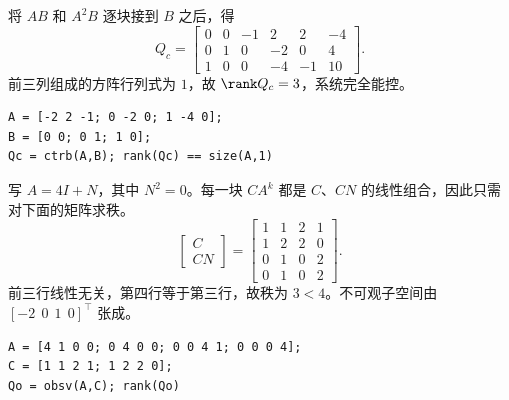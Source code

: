 

\sol 将 $AB$ 和 $A^2B$ 逐块接到 $B$ 之后，得
\[
    Q_c=\begin{bmatrix}
    0&0&-1&2&2&-4\\ 0&1&0&-2&0&4\\ 1&0&0&-4&-1&10
    \end{bmatrix}.
\]
前三列组成的方阵行列式为 $1$，故 $\rank Q_c=3$，系统完全能控。
\begin{verbatim}
A = [-2 2 -1; 0 -2 0; 1 -4 0];
B = [0 0; 0 1; 1 0];
Qc = ctrb(A,B); rank(Qc) == size(A,1)
\end{verbatim}



\sol 写 $A=4I+N$，其中 $N^2=0$。每一块 $CA^k$ 都是 $C$、$CN$ 的线性组合，因此只需对下面的矩阵求秩。
\[
    \begin{bmatrix}C\\CN\end{bmatrix}
    =\begin{bmatrix}1&1&2&1\\1&2&2&0\\0&1&0&2\\0&1&0&2\end{bmatrix}.
\]
前三行线性无关，第四行等于第三行，故秩为 $3<4$。不可观子空间由 $[-2\ \ 0\ \ 1\ \ 0]^\top$ 张成。
\begin{verbatim}
A = [4 1 0 0; 0 4 0 0; 0 0 4 1; 0 0 0 4];
C = [1 1 2 1; 1 2 2 0];
Qo = obsv(A,C); rank(Qo)
\end{verbatim}

